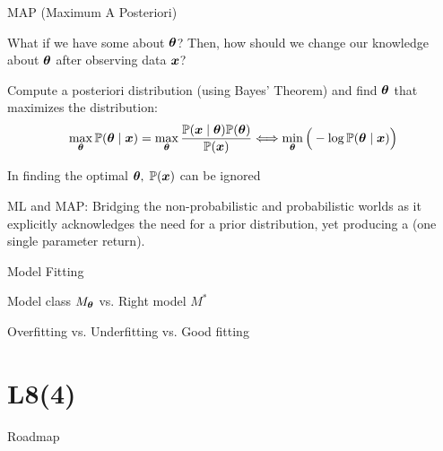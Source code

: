 \documentclass[handout,fleqn,aspectratio=169]{beamer}
\begin{document}
\begin{frame}{MAP (Maximum A Posteriori)}

\plitemsep 0.1in

\bci 

\item What if we have some  about $\bm{\theta}$? Then, how should we change our knowledge about $\bm{\theta}$ after observing data $\bm{x}$?

\item Compute a posteriori distribution (using Bayes' Theorem) and find $\bm{\theta}$ that maximizes the distribution:
$$
\max_{\bm{\theta}} \mathbb{P}( \bm{\theta} \mid \bm{x} ) = \max_{\bm{\theta}} \frac{\mathbb{P}( \bm{x} \mid \bm{\theta} )\mathbb{P}( \bm{\theta} )}{\mathbb{P}( \bm{x} )} 
\Longleftrightarrow \min_{\bm{\theta}}\Big (  -\log \mathbb{P}( \bm{\theta} \mid \bm{x} ) \Big )
$$
\bci
\item In finding the optimal $\bm{\theta},$ $\mathbb{P}( \bm{x} )$ can be ignored
\eci
\item ML and MAP: Bridging the non-probabilistic and probabilistic worlds as it explicitly acknowledges the need for a prior distribution, yet producing a  (one single parameter return). 

\eci
\end{frame}


\begin{frame}{Model Fitting}

\plitemsep 0.1in

\bci 

\item Model class $M_{\bm{\theta}}$ vs. Right model $M^*$

\item Overfitting vs. Underfitting vs. Good fitting
\eci
\end{frame}

\section{L8(4)}
\begin{frame}{Roadmap}

\plitemsep 0.1in

\bce[(1)] 

\item {}
\item {} 
\item {}
\item {} 
\item {}

\ece
\end{frame}
\end{document}
